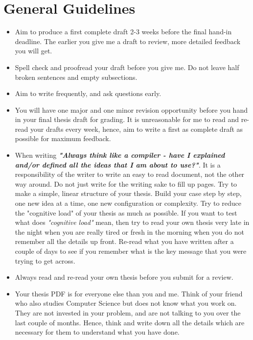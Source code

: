 \section*{General Guidelines}
\begin{itemize}
    \item Aim to produce a first complete draft 2-3 weeks before the final hand-in deadline. The earlier you give me a draft to review, more detailed feedback you will get. 
    \item Spell check and proofread your draft before you give me. Do not leave half broken sentences and empty subsections.
    \item Aim to write frequently, and ask questions early. 
    \item You will have one major and one minor revision opportunity before you hand in your final thesis draft for grading. It is unreasonable for me to read and re-read your drafts every week, hence, aim to write a first as complete draft as possible for maximum feedback. 
    \item When writing \textbf{\textit{"Always think like a compiler - have I explained and/or defined all the ideas that I am about to use?"}}. It is a responsibility of the writer to write an easy to read document, not the other way around. Do not just write for the writing sake to fill up pages. Try to make a simple, linear structure of your thesis. Build your case step by step, one new idea at a time, one new configuration or complexity. Try to reduce the "cognitive load" of your thesis as much as possible. If you want to test what does \textit{"cognitive load"} mean, then try to read your own thesis very late in the night when you are really tired or fresh in the morning when you do not remember all the details up front. Re-read what you have written after a couple of days to see if you remember what is the key message that you were trying to get across. 
    \item Always read and re-read your own thesis before you submit for a review. 
    \item Your thesis PDF is for everyone else than you and me. Think of your friend who also studies Computer Science but does not know what you work on. They are not invested in your problem, and are not talking to you over the last couple of months. Hence, think and write down all the details which are necessary for them to understand what you have done. 
\end{itemize}

